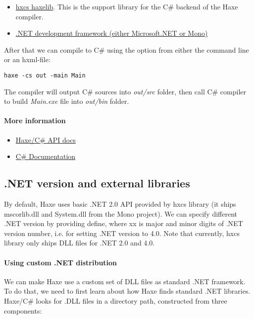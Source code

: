 \begin{itemize}
	\item \href{http://lib.haxe.org/p/hxcs}{hxcs haxelib}. This is the support library for the C\# backend of the Haxe compiler.
	\item \href{https://www.microsoft.com/net}{.NET development framework (either Microsoft.NET or Mono)}
\end{itemize}

After that we can compile to C\# using the  option from either the command line or an hxml-file:

\begin{lstlisting}
haxe -cs out -main Main
\end{lstlisting}

The compiler will output C\# sources into  \emph{out/src} folder, then call C\# compiler to build  \emph{Main.exe} file into  \emph{out/bin} folder.

\paragraph{More information}

\begin{itemize}
	\item \href{https://api.haxe.org/cs/}{Haxe/C\# API docs}
	\item \href{https://msdn.microsoft.com/en-us/library/kx37x362.aspx}{C\# Documentation}
\end{itemize}


\subsection{.NET version and external libraries}
\label{target-cs-external-libraries}

By default, Haxe uses basic .NET 2.0 API provided by hxcs library (it ships mscorlib.dll and System.dll from the Mono project). We can specify different .NET version by providing  define, where xx is major and minor digits of .NET version number, i.e.  for setting .NET version to 4.0. Note that currently, hxcs library only ships DLL files for .NET 2.0 and 4.0.

\paragraph{Using custom .NET distribution}

We can make Haxe use a custom set of DLL files as standard .NET framework. To do that, we need to first learn about how Haxe finds standard .NET libraries. Haxe/C\# looks for .DLL files in a directory path, constructed from three components:

